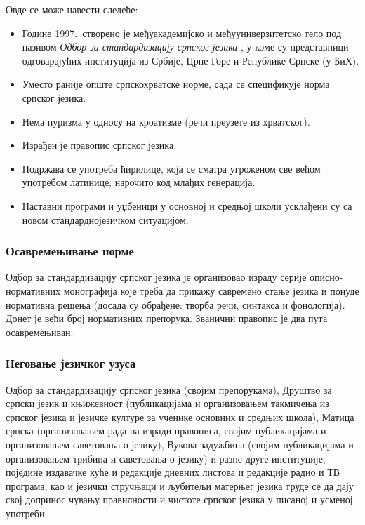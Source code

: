 \begin{multicols}{2}

 Овде се може навести следеће:
\begin{itemize}
\item Године 1997.~створено је међуакадемијско и међууниверзитетско тело под називом \textit{Одбор за стандардизацију српског језика} \cite{BSSL}, у коме су представници одговарајућих институција из Србије, Црне Горе и Републике Српске (у БиХ). 
\item Уместо раније опште српскохрватске норме, сада се спецификује норма српског језика.
\item Нема пуризма у односу на кроатизме (речи преузете из хрватског). 
\item Израђен је правопис српског језика.
\item Подржава се употреба ћирилице, која се сматра угроженом све већом употребом латинице, нарочито код млађих генерација. 
\item Наставни програми и уџбеници у основној и средњој школи усклађени су са новом стандарднојезичком ситуацијом.
\end{itemize}
 
 \subsubsection {Осавремењивање норме}
   
  Одбор за стандардизацију српског језика је организовао израду серије описно-нормативних монографија које треба да прикажу савремено стање језика и понуде нормативна решења (досада су обрађене: творба речи, синтакса и фонологија). Донет је већи број нормативних препорука. Званични правопис је два пута осавремењиван.

 \subsubsection {Неговање језичког узуса}
 
Одбор за стандардизацију српског језика (својим препорукама), Друштво за српски језик и књижевност (публикацијама и организовањем такмичења из српског језика и језичке културе за ученике основних и средњих  школа), Матица српска (организовањем рада на изради правописа, својим публикацијама и организовањем саветовања о језику), Вукова задужбина (својим публикацијама и организовањем трибина и саветовања о језику) и разне друге институције, поједине издавачке куће и редакције дневних листова и редакције радио и ТВ програма, као и језички стручњаци и љубитељи матерњег језика труде се да дају свој допринос чувању правилности и чистоте српског језика у писаној и усменој употреби.  


\end{multicols}
